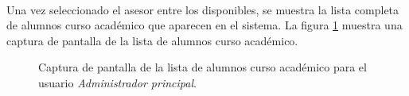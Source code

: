   \paragraph{}Una vez seleccionado el asesor entre los disponibles, se muestra
  la lista completa de alumnos curso académico que aparecen en el sistema. La
  figura \ref{capturaPantallaListaAlumnosCAAdminPrincipal} muestra una captura
  de pantalla de la lista de alumnos curso académico.

  \begin{figure}[!ht]
    \begin{center}
      \caption{Captura de pantalla de la lista de alumnos curso académico para el usuario \textit{Administrador principal}.}
      \label{capturaPantallaListaAlumnosCAAdminPrincipal}
    \end{center}
  \end{figure}

